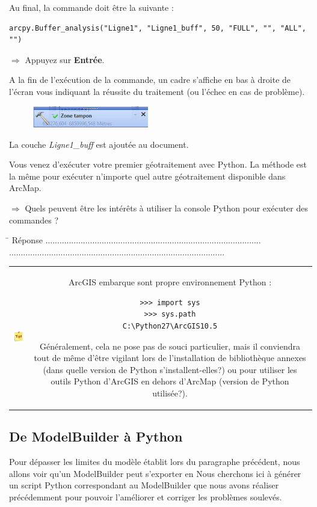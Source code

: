 \documentclass[11pt]{article}
\newcommand{\action}{$\Rightarrow$ }
\newcommand{\reponse}{
	\begin{tabbing}
	\hspace{2cm}\=\kill
	Réponse \> ............................................................................................ \\
 	\> ............................................................................................
	\end{tabbing}
}
\newenvironment{note}{%
	\begin{tabular}[t t]{c c}
		\includegraphics{img/tips.png}
		 &
		\begin{minipage}[c]{0.9\linewidth}
			\begin{sffamily}
}{%
			\end{sffamily}
		\end{minipage}
	\end{tabular}
}
\begin{document}
Au final, la commande doit être la suivante :
\begin{lstlisting}
arcpy.Buffer_analysis("Ligne1", "Ligne1_buff", 50, "FULL", "", "ALL", "")
\end{lstlisting}

\action Appuyez sur \textbf{Entrée}.

A la fin de l'exécution de la commande, un cadre s'affiche en bas à droite de l'écran vous indiquant la réussite du traitement (ou l'échec en cas de problème).
\begin{figure}[H]
	\center \includegraphics[width=0.45\textwidth]{img/td3/python_resultat_geotraitement.png}\\
\end{figure}

La couche \textit{Ligne1\_buff} est ajoutée au document.

Vous venez d'exécuter votre premier géotraitement avec Python. La méthode est la même pour exécuter n'importe quel autre géotraitement disponible dans ArcMap.

\action Quels peuvent être les intérêts à utiliser la console Python pour exécuter des commandes ?

\reponse

\begin{note}
ArcGIS embarque sont propre environnement Python :
\begin{lstlisting}
>>> import sys
>>> sys.path
C:\Python27\ArcGIS10.5
\end{lstlisting}
Généralement, cela ne pose pas de souci particulier, mais il conviendra tout de même d'être vigilant lors de l'installation de bibliothèque annexes (dans quelle version de Python s'installent-elles?) ou pour utiliser les outils Python d'ArcGIS en dehors d'ArcMap (version de Python utilisée?).
\end{note}





\subsection{De ModelBuilder à Python}
\label{scriptautonome}
Pour dépasser les limites du modèle établit lors du paragraphe précédent, nous allons voir qu'un ModelBuilder peut s'exporter en
Nous cherchons ici à générer un script Python correspondant au ModelBuilder que nous avons réaliser précédemment pour pouvoir l'améliorer et corriger les problèmes soulevés.
\end{document}

